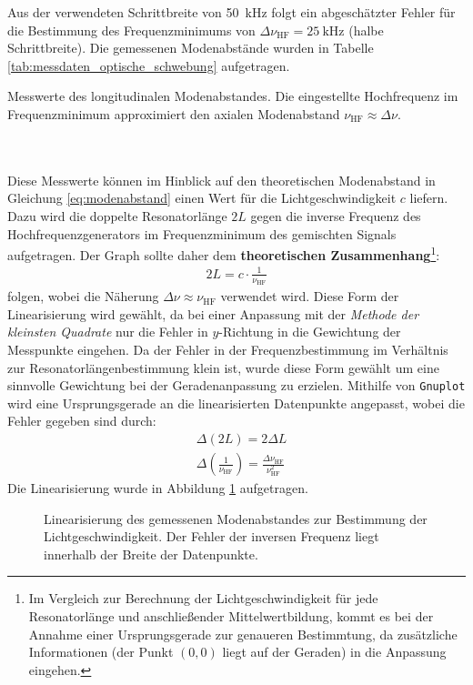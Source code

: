 \documentclass[11pt, a4paper]{article}
\numberwithin{equation}{section}
\begin{document}
Aus der verwendeten Schrittbreite von \SI{50}{\kilo\hertz} folgt ein abgeschätzter Fehler für die Bestimmung des Frequenzminimums von $\Delta \nu_\mathrm{HF} = \SI{25}{\kilo\hertz}$ (halbe Schrittbreite).
Die gemessenen Modenabstände wurden in Tabelle \ref{tab:messdaten_optische_schwebung} aufgetragen.
\begin{table}[h]
	\centering
	
	\caption{Messwerte des longitudinalen Modenabstandes. Die eingestellte Hochfrequenz im Frequenzminimum approximiert den axialen Modenabstand $\nu_\mathrm{HF} \approx \Delta \nu$.}
	\label{tab:messdaten_optische_schwebung}
\end{table}\\
\\
Diese Messwerte können im Hinblick auf den theoretischen Modenabstand in Gleichung \eqref{eq:modenabstand} einen Wert für die Lichtgeschwindigkeit $c$ liefern.
Dazu wird die doppelte Resonatorlänge $2 L$ gegen die inverse Frequenz des Hochfrequenzgenerators im Frequenzminimum des gemischten Signals aufgetragen.
Der Graph sollte daher dem \textbf{theoretischen Zusammenhang}\footnote{Im Vergleich zur Berechnung der Lichtgeschwindigkeit für jede Resonatorlänge und anschließender Mittelwertbildung, kommt es bei der Annahme einer Ursprungsgerade zur genaueren Bestimmtung, da zusätzliche Informationen (der Punkt $(0,0)$ liegt auf der Geraden) in die Anpassung eingehen.}:
\begin{align}
	2 L = c \cdot \frac{1}{\nu_\mathrm{HF}}
\end{align}
folgen, wobei die Näherung $\Delta \nu \approx \nu_\mathrm{HF}$ verwendet wird.
Diese Form der Linearisierung wird gewählt, da bei einer Anpassung mit der \emph{Methode der kleinsten Quadrate} nur die Fehler in $y$-Richtung in die Gewichtung der Messpunkte eingehen.
Da der Fehler in der Frequenzbestimmung im Verhältnis zur Resonatorlängenbestimmung klein ist, wurde diese Form gewählt um eine sinnvolle Gewichtung bei der Geradenanpassung zu erzielen.
Mithilfe von \texttt{Gnuplot} wird eine Ursprungsgerade an die linearisierten Datenpunkte angepasst, wobei die Fehler gegeben sind durch:
\begin{align}
&\Delta(2L) = 2 \Delta L \\
&\Delta \left( \frac{1}{\nu_\mathrm{HF}} \right) = \frac{\Delta \nu_\mathrm{HF}}{\nu_\mathrm{HF}^2}
\end{align}
Die Linearisierung wurde in Abbildung \ref{fig:linearisierung_modenabstand} aufgetragen.
\begin{figure}[h]
	\centering
	
	\caption{Linearisierung des gemessenen Modenabstandes zur Bestimmung der Lichtgeschwindigkeit. Der Fehler der inversen Frequenz liegt innerhalb der Breite der Datenpunkte.}
	\label{fig:linearisierung_modenabstand}
\end{figure}
\end{document}
